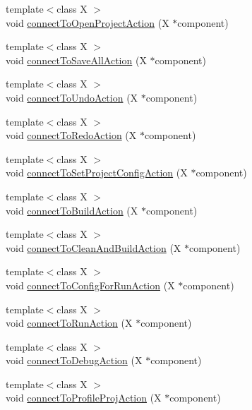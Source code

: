 \begin{DoxyCompactItemize}
\item 
{\footnotesize template$<$class X $>$ }\\void \hyperlink{class_master_actions_aa792c3936e0b0b4c016d01ad4a1c5803}{connect\-To\-Open\-Project\-Action} (X $\ast$component)
\item 
{\footnotesize template$<$class X $>$ }\\void \hyperlink{class_master_actions_ab859d0b5419ae5f17504e8fdd83be4be}{connect\-To\-Save\-All\-Action} (X $\ast$component)
\item 
{\footnotesize template$<$class X $>$ }\\void \hyperlink{class_master_actions_a6590f8772608e4d99efbf16ef9625b78}{connect\-To\-Undo\-Action} (X $\ast$component)
\item 
{\footnotesize template$<$class X $>$ }\\void \hyperlink{class_master_actions_a6077c09ff4426c4a99eaa33ff12f22e4}{connect\-To\-Redo\-Action} (X $\ast$component)
\item 
{\footnotesize template$<$class X $>$ }\\void \hyperlink{class_master_actions_a5e25d464651d37d48c7e6a4714130dd7}{connect\-To\-Set\-Project\-Config\-Action} (X $\ast$component)
\item 
{\footnotesize template$<$class X $>$ }\\void \hyperlink{class_master_actions_a9625507b1a412bd95bdc13ae54bc68a2}{connect\-To\-Build\-Action} (X $\ast$component)
\item 
{\footnotesize template$<$class X $>$ }\\void \hyperlink{class_master_actions_a86232c67d3599a28c6b5238eb6dd4e88}{connect\-To\-Clean\-And\-Build\-Action} (X $\ast$component)
\item 
{\footnotesize template$<$class X $>$ }\\void \hyperlink{class_master_actions_a87ff14d6fdf08f3730bb733747335dcb}{connect\-To\-Config\-For\-Run\-Action} (X $\ast$component)
\item 
{\footnotesize template$<$class X $>$ }\\void \hyperlink{class_master_actions_a73ec685aa0f239226bdda78857b9e234}{connect\-To\-Run\-Action} (X $\ast$component)
\item 
{\footnotesize template$<$class X $>$ }\\void \hyperlink{class_master_actions_a9c1baa889fbb545dc9607044839d5813}{connect\-To\-Debug\-Action} (X $\ast$component)
\item 
{\footnotesize template$<$class X $>$ }\\void \hyperlink{class_master_actions_afa0a093fb60aaeb8c6635e11ec89e121}{connect\-To\-Profile\-Proj\-Action} (X $\ast$component)

\end{DoxyCompactItemize}
